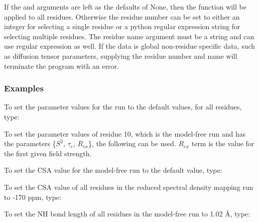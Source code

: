 If the  and  arguments are left as the defaults of None, then the function will be applied to all residues.  Otherwise the residue number can be set to either an integer for selecting a single residue or a python regular expression string for selecting multiple residues.  The residue name argument must be a string and can use regular expression as well.  If the data is global non-residue specific data, such as diffusion tensor parameters, supplying the residue number and name will terminate the program with an error.



\subsubsection{Examples}

To set the parameter values for the run  to the default values, for all residues, type:



To set the parameter values of residue 10, which is the model-free run  and has the parameters \{$S^2$, $\tau_e$, $R_{ex}$\}, the following can be used.  $R_{ex}$ term is the value for the first given field strength.




To set the CSA value for the model-free run  to the default value, type:



To set the CSA value of all residues in the reduced spectral density mapping run  to -170 ppm, type:




To set the NH bond length of all residues in the model-free run  to 1.02 \AA, type:




